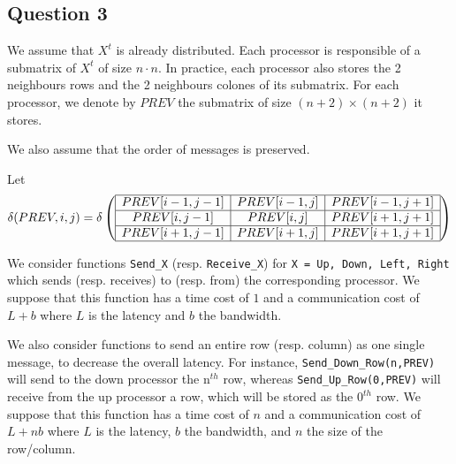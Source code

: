 
\subsection*{Question 3}

We assume that $X^t$ is already distributed. Each processor is responsible of a submatrix of $X^t$ of size $n \cdot n$. In practice, each processor also stores the 2 neighbours rows and the 2 neighbours colones of its submatrix. For each processor, we denote by $PREV$ the submatrix of size $(n+2) \times (n+2)$ it stores.

We also assume that the order of messages is preserved.

Let $$\delta(PREV,i,j) = \delta \left( \begin{array}{ | c | c | c |} \hline

  PREV[i-1,j-1] & PREV[i-1,j] & PREV[i-1,j+1] \\ \hline

  PREV[i,j-1] & PREV[i,j] & PREV[i+1,j+1] \\ \hline

  PREV[i+1,j-1] & PREV[i+1,j] & PREV[i+1,j+1] \\ \hline

 \end{array} \right)$$

We consider functions \texttt{Send\_X} (resp. \texttt{Receive\_X}) for \texttt{X = Up, Down, Left, Right} which sends (resp. receives) to (resp. from) the corresponding processor. 
We suppose that this function has a time cost of $1$ and a communication cost of $L+b$ where $L$ is the latency and $b$ the bandwidth.

We also consider functions to send an entire row (resp. column) as one single message, to decrease the overall latency. For instance, \texttt{Send\_Down\_Row(n,PREV)} will send to the down processor the $\text{n}^{th}$ row, whereas \texttt{Send\_Up\_Row(0,PREV)} will receive from the up processor a row, which will be stored as the $\text{0}^{th}$ row.
We suppose that this function has a time cost of $n$ and a communication cost of $L+nb$ where $L$ is the latency, $b$ the bandwidth, and $n$ the size of the row/column.

